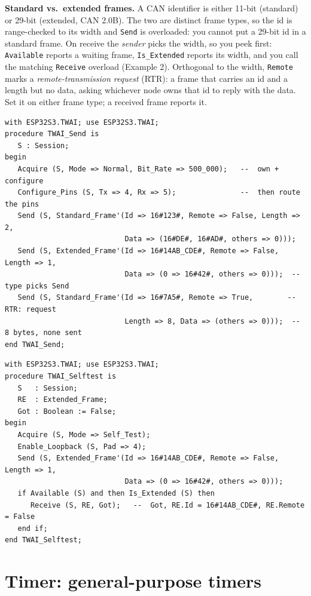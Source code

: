 \textbf{Standard vs.\ extended frames.} A CAN identifier is either 11-bit
(standard) or 29-bit (extended, CAN 2.0B). The two are distinct frame types, so
the id is range-checked to its width and \texttt{Send} is overloaded: you
cannot put a 29-bit id in a standard frame. On receive the \emph{sender} picks
the width, so you peek first: \texttt{Available} reports a waiting frame,
\texttt{Is\_Extended} reports its width, and you call the matching
\texttt{Receive} overload (Example 2). Orthogonal to the width, \texttt{Remote}
marks a \emph{remote-transmission request} (RTR): a frame that carries an id and a
length but no data, asking whichever node owns that id to reply with the data.
Set it on either frame type; a received frame reports it.

\begin{lstlisting}
with ESP32S3.TWAI; use ESP32S3.TWAI;
procedure TWAI_Send is
   S : Session;
begin
   Acquire (S, Mode => Normal, Bit_Rate => 500_000);   --  own + configure
   Configure_Pins (S, Tx => 4, Rx => 5);               --  then route the pins
   Send (S, Standard_Frame'(Id => 16#123#, Remote => False, Length => 2,
                            Data => (16#DE#, 16#AD#, others => 0)));
   Send (S, Extended_Frame'(Id => 16#14AB_CDE#, Remote => False, Length => 1,
                            Data => (0 => 16#42#, others => 0)));  -- type picks Send
   Send (S, Standard_Frame'(Id => 16#7A5#, Remote => True,        -- RTR: request
                            Length => 8, Data => (others => 0)));  -- 8 bytes, none sent
end TWAI_Send;
\end{lstlisting}

\begin{lstlisting}
with ESP32S3.TWAI; use ESP32S3.TWAI;
procedure TWAI_Selftest is
   S   : Session;
   RE  : Extended_Frame;
   Got : Boolean := False;
begin
   Acquire (S, Mode => Self_Test);
   Enable_Loopback (S, Pad => 4);
   Send (S, Extended_Frame'(Id => 16#14AB_CDE#, Remote => False, Length => 1,
                            Data => (0 => 16#42#, others => 0)));
   if Available (S) and then Is_Extended (S) then
      Receive (S, RE, Got);   --  Got, RE.Id = 16#14AB_CDE#, RE.Remote = False
   end if;
end TWAI_Selftest;
\end{lstlisting}

\section{Timer: general-purpose timers}

